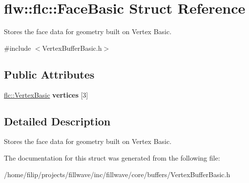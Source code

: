 \hypertarget{structflw_1_1flc_1_1FaceBasic}{}\section{flw\+:\+:flc\+:\+:Face\+Basic Struct Reference}
\label{structflw_1_1flc_1_1FaceBasic}


Stores the face data for geometry built on Vertex Basic.  




{\ttfamily \#include $<$Vertex\+Buffer\+Basic.\+h$>$}

\subsection*{Public Attributes}
\begin{DoxyCompactItemize}
\item 
\mbox{\label{structflw_1_1flc_1_1FaceBasic_a38791ec533656c6001d311132000774b}} 
\hyperlink{structflw_1_1flc_1_1VertexBasic}{flc\+::\+Vertex\+Basic} {\bfseries vertices} \mbox{[}3\mbox{]}
\end{DoxyCompactItemize}


\subsection{Detailed Description}
Stores the face data for geometry built on Vertex Basic. 

The documentation for this struct was generated from the following file\+:\begin{DoxyCompactItemize}
\item 
/home/filip/projects/fillwave/inc/fillwave/core/buffers/Vertex\+Buffer\+Basic.\+h\end{DoxyCompactItemize}
